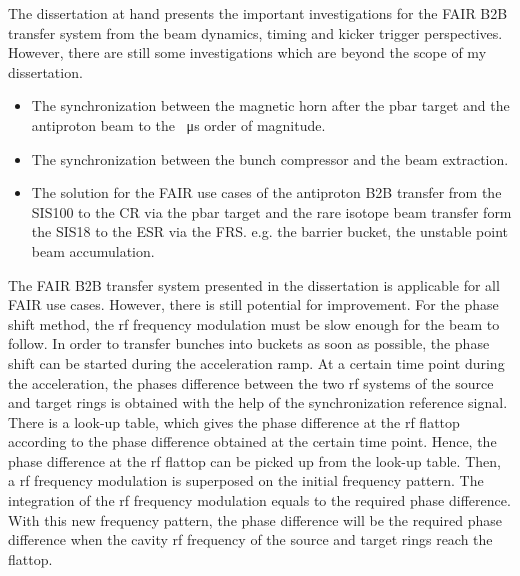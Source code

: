 The dissertation at hand presents the important investigations for the FAIR B2B transfer system from the beam dynamics, timing and kicker trigger perspectives. However, there are still some investigations which are beyond the scope of my dissertation.
\begin{itemize}
	\item The synchronization between the magnetic horn after the pbar target and the antiproton beam to the \SI{}{\us} order of magnitude.

	\item  The synchronization between the bunch compressor and the beam extraction.

	\item The solution for the FAIR use cases of the antiproton B2B transfer from the SIS100 to the CR via the pbar target and the rare isotope beam transfer form the SIS18 to the ESR via the FRS. e.g. the barrier bucket, the unstable point beam accumulation.

\end{itemize}


The FAIR B2B transfer system presented in the dissertation is applicable for all FAIR use cases. However, there is still potential for improvement. For the phase shift method, the rf frequency modulation must be slow enough for the beam to follow. In order to transfer bunches into buckets as soon as possible, the phase shift can be started during the acceleration ramp. At a certain time point during the acceleration, the phases difference between the two rf systems of the source and target rings is obtained with the help of the synchronization reference signal. There is a look-up table, which gives the phase difference at the rf flattop according to the phase difference obtained at the certain time point. Hence, the phase difference at the rf flattop can be picked up from the look-up table. Then, a rf frequency modulation is superposed on the initial frequency pattern. The integration of the rf frequency modulation equals to the required phase difference. With this new frequency pattern, the phase difference will be the required phase difference when the cavity rf frequency of the source and target rings reach the flattop. 

